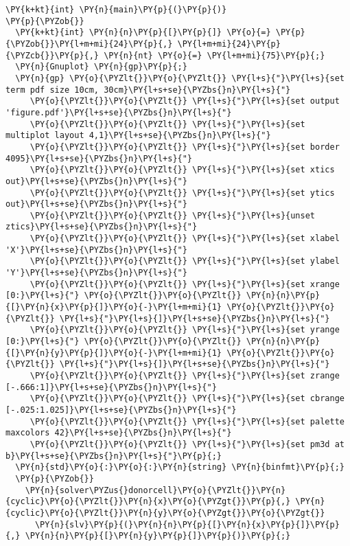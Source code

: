 \begin{Verbatim}[commandchars=\\\{\}]
\PY{k+kt}{int} \PY{n}{main}\PY{p}{(}\PY{p}{)} 
\PY{p}{\PYZob{}}
  \PY{k+kt}{int} \PY{n}{n}\PY{p}{[}\PY{p}{]} \PY{o}{=} \PY{p}{\PYZob{}}\PY{l+m+mi}{24}\PY{p}{,} \PY{l+m+mi}{24}\PY{p}{\PYZcb{}}\PY{p}{,} \PY{n}{nt} \PY{o}{=} \PY{l+m+mi}{75}\PY{p}{;}
  \PY{n}{Gnuplot} \PY{n}{gp}\PY{p}{;}
  \PY{n}{gp} \PY{o}{\PYZlt{}}\PY{o}{\PYZlt{}} \PY{l+s}{"}\PY{l+s}{set term pdf size 10cm, 30cm}\PY{l+s+se}{\PYZbs{}n}\PY{l+s}{"} 
     \PY{o}{\PYZlt{}}\PY{o}{\PYZlt{}} \PY{l+s}{"}\PY{l+s}{set output 'figure.pdf'}\PY{l+s+se}{\PYZbs{}n}\PY{l+s}{"}     
     \PY{o}{\PYZlt{}}\PY{o}{\PYZlt{}} \PY{l+s}{"}\PY{l+s}{set multiplot layout 4,1}\PY{l+s+se}{\PYZbs{}n}\PY{l+s}{"} 
     \PY{o}{\PYZlt{}}\PY{o}{\PYZlt{}} \PY{l+s}{"}\PY{l+s}{set border 4095}\PY{l+s+se}{\PYZbs{}n}\PY{l+s}{"}
     \PY{o}{\PYZlt{}}\PY{o}{\PYZlt{}} \PY{l+s}{"}\PY{l+s}{set xtics out}\PY{l+s+se}{\PYZbs{}n}\PY{l+s}{"}
     \PY{o}{\PYZlt{}}\PY{o}{\PYZlt{}} \PY{l+s}{"}\PY{l+s}{set ytics out}\PY{l+s+se}{\PYZbs{}n}\PY{l+s}{"}
     \PY{o}{\PYZlt{}}\PY{o}{\PYZlt{}} \PY{l+s}{"}\PY{l+s}{unset ztics}\PY{l+s+se}{\PYZbs{}n}\PY{l+s}{"}    
     \PY{o}{\PYZlt{}}\PY{o}{\PYZlt{}} \PY{l+s}{"}\PY{l+s}{set xlabel 'X'}\PY{l+s+se}{\PYZbs{}n}\PY{l+s}{"}
     \PY{o}{\PYZlt{}}\PY{o}{\PYZlt{}} \PY{l+s}{"}\PY{l+s}{set ylabel 'Y'}\PY{l+s+se}{\PYZbs{}n}\PY{l+s}{"}
     \PY{o}{\PYZlt{}}\PY{o}{\PYZlt{}} \PY{l+s}{"}\PY{l+s}{set xrange [0:}\PY{l+s}{"} \PY{o}{\PYZlt{}}\PY{o}{\PYZlt{}} \PY{n}{n}\PY{p}{[}\PY{n}{x}\PY{p}{]}\PY{o}{-}\PY{l+m+mi}{1} \PY{o}{\PYZlt{}}\PY{o}{\PYZlt{}} \PY{l+s}{"}\PY{l+s}{]}\PY{l+s+se}{\PYZbs{}n}\PY{l+s}{"}   
     \PY{o}{\PYZlt{}}\PY{o}{\PYZlt{}} \PY{l+s}{"}\PY{l+s}{set yrange [0:}\PY{l+s}{"} \PY{o}{\PYZlt{}}\PY{o}{\PYZlt{}} \PY{n}{n}\PY{p}{[}\PY{n}{y}\PY{p}{]}\PY{o}{-}\PY{l+m+mi}{1} \PY{o}{\PYZlt{}}\PY{o}{\PYZlt{}} \PY{l+s}{"}\PY{l+s}{]}\PY{l+s+se}{\PYZbs{}n}\PY{l+s}{"}   
     \PY{o}{\PYZlt{}}\PY{o}{\PYZlt{}} \PY{l+s}{"}\PY{l+s}{set zrange [-.666:1]}\PY{l+s+se}{\PYZbs{}n}\PY{l+s}{"}   
     \PY{o}{\PYZlt{}}\PY{o}{\PYZlt{}} \PY{l+s}{"}\PY{l+s}{set cbrange [-.025:1.025]}\PY{l+s+se}{\PYZbs{}n}\PY{l+s}{"}     
     \PY{o}{\PYZlt{}}\PY{o}{\PYZlt{}} \PY{l+s}{"}\PY{l+s}{set palette maxcolors 42}\PY{l+s+se}{\PYZbs{}n}\PY{l+s}{"}
     \PY{o}{\PYZlt{}}\PY{o}{\PYZlt{}} \PY{l+s}{"}\PY{l+s}{set pm3d at b}\PY{l+s+se}{\PYZbs{}n}\PY{l+s}{"}\PY{p}{;}
  \PY{n}{std}\PY{o}{:}\PY{o}{:}\PY{n}{string} \PY{n}{binfmt}\PY{p}{;}
  \PY{p}{\PYZob{}}
    \PY{n}{solver\PYZus{}donorcell}\PY{o}{\PYZlt{}}\PY{n}{cyclic}\PY{o}{\PYZlt{}}\PY{n}{x}\PY{o}{\PYZgt{}}\PY{p}{,} \PY{n}{cyclic}\PY{o}{\PYZlt{}}\PY{n}{y}\PY{o}{\PYZgt{}}\PY{o}{\PYZgt{}} 
      \PY{n}{slv}\PY{p}{(}\PY{n}{n}\PY{p}{[}\PY{n}{x}\PY{p}{]}\PY{p}{,} \PY{n}{n}\PY{p}{[}\PY{n}{y}\PY{p}{]}\PY{p}{)}\PY{p}{;}

\end{Verbatim}
